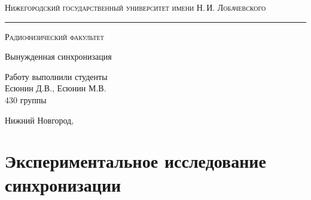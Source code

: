 \documentclass[a4paper,14pt]{extarticle}
\def\labauthors{Есюнин Д.В., Есюнин М.В.}
\def\labtheme{Вынужденная синхронизация}
\begin{document}
	\begin{titlepage}

		\begin{center}
			
			
			\textsc{Нижегородский государственный университет имени Н.\,И. Лобачевского}
			\vskip 4pt \hrule \vskip 8pt
			\textsc{Радиофизический факультет}
			
			\vfill
			
			{\Large\labtheme}
			
		\end{center}
		
		\vfill
		
		\begin{flushright}
			{Работу выполнили студенты\\ \labauthors\\ 430 группы}
		\end{flushright}
		
		\vfill
		
		\begin{center}
			Нижний Новгород, \the\year
		\end{center}
	\end{titlepage}
	\newpage 
\section*{Экспериментальное исследование синхронизации}
\end{document}
